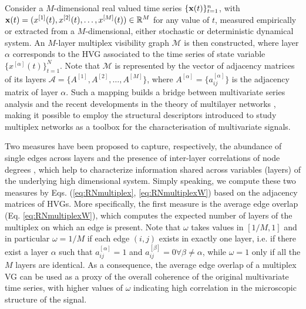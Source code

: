 		Consider a $M$-dimensional real valued time series $\{{\bf{x}}(t) \}_{t=1}^{n}$, with ${\bf{x}}(t) = (x^{[1]}(t), x^{[2]}(t), \dots, x^{[M]}(t)) \in \mathbb{R}^M$ for any value of $t$, measured empirically or extracted from a $M$-dimensional, either stochastic or deterministic dynamical system. An $M$-layer multiplex visibility graph $\mathcal{M}$ is then constructed, where layer $\alpha$ corresponds to the HVG associated to the time series of state variable $\{ x^{[\alpha]}(t) \}_{t=1}^{N}$. Note that $\mathcal{M}$ is represented by the vector of adjacency matrices of its layers $\mathcal{A} = \{A^{[1]}, A^{[2]}, \dots, A^{[M]}\}$, where $A^{[\alpha]} = \{a_{ij}^{[\alpha]} \}$ is the adjacency matrix of layer $\alpha$. Such a mapping builds a bridge between multivariate series analysis and the recent developments in the theory of multilayer networks \cite{Boccaletti2014}, making it possible to employ the structural descriptors introduced to study multiplex networks as a toolbox for the characterisation of multivariate signals. 
		
		Two measures have been proposed to capture, respectively, the abundance of single edges across layers and the presence of inter-layer correlations of node degrees \cite{Lacasa2015b}, which help to characterize information shared across variables (layers) of the underlying high dimensional system. Simply speaking, we compute these two measures by Eqs. (\ref{eq:RNmultiplex}, \ref{eq:RNmultiplexW}) based on the adjacency matrices of HVGs. More specifically, the first measure is the average edge overlap (Eq. \eqref{eq:RNmultiplexW}),  	
which computes the expected number of layers of the multiplex on which an edge is present. Note that $\omega$ takes values in $[1/M, 1]$ and in particular $\omega = 1/M$ if each edge $(i, j)$ exists in exactly one layer, i.e. if there exist a layer $\alpha$ such that $a_{ij}^{[\alpha]} = 1$ and $a_{ij}^{[\beta]} = 0 \forall \beta \neq \alpha$, while $\omega = 1$ only if all the $M$ layers are identical. As a consequence, the average edge overlap of a multiplex VG can be used as a proxy of the overall coherence of the original multivariate time series, with higher values of $\omega$ indicating high correlation in the microscopic structure of the signal. 

